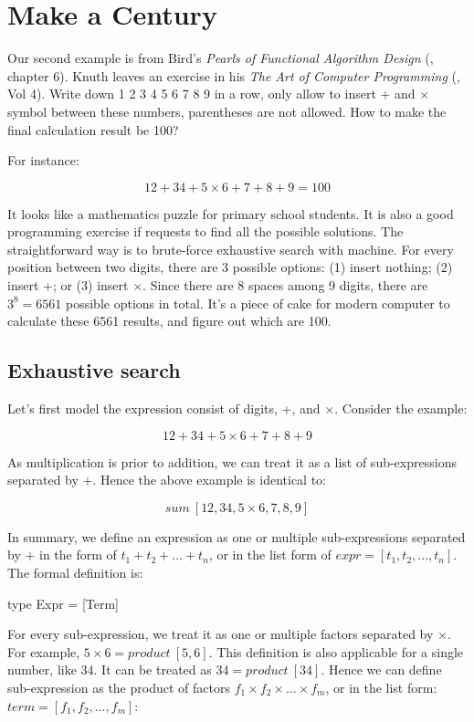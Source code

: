\documentclass[b5paper]{article}
\begin{document}
\section{Make a Century}

Our second example is from Bird's {\em Pearls of Functional Algorithm Design} (\cite{Bird-2010}, chapter 6). Knuth leaves an exercise in his {\em The Art of Computer Programming} (\cite{Knuth-TAOCP-2006}, Vol 4). Write down 1 2 3 4 5 6 7 8 9 in a row, only allow to insert + and $\times$ symbol between these numbers, parentheses are not allowed. How to make the final calculation result be 100?

For instance:

\[
12 + 34 + 5 \times 6 + 7 + 8 + 9 = 100
\]

It looks like a mathematics puzzle for primary school students. It is also a good programming exercise if requests to find all the possible solutions. The straightforward way is to brute-force exhaustive search with machine. For every position between two digits, there are 3 possible options: (1) insert nothing; (2) insert +; or (3) insert $\times$. Since there are 8 spaces among 9 digits, there are $3^8 = 6561$ possible options in total. It's a piece of cake for modern computer to calculate these 6561 results, and figure out which are 100.

\subsection{Exhaustive search}

Let's first model the expression consist of digits, +, and $\times$. Consider the example:

\[
12 + 34 + 5 \times 6 + 7 + 8 + 9
\]

As multiplication is prior to addition, we can treat it as a list of sub-expressions separated by +. Hence the above example is identical to:

\[
sum\ [12, 34, 5 \times 6, 7, 8, 9]
\]

In summary, we define an expression as one or multiple sub-expressions separated by + in the form of $t_1 + t_2 + ... + t_n$, or in the list form of $expr = [t_1, t_2, ..., t_n]$. The formal definition is:

\lstset{frame = single}
\begin{Haskell}
type Expr = [Term]
\end{Haskell}

For every sub-expression, we treat it as one or multiple factors separated by $\times$. For example, $5 \times 6 = product\ [5, 6]$. This definition is also applicable for a single number, like $34$. It can be treated as $34 = product\ [34]$. Hence we can define sub-expression as the product of factors $f_1 \times f_2 \times ... \times f_m$, or in the list form: $term = [f_1, f_2, ..., f_m]$:
\end{document}
